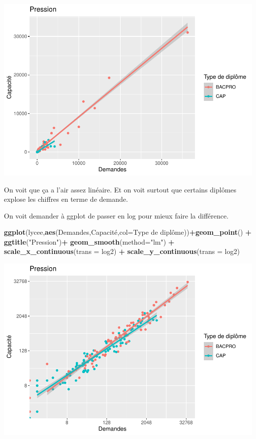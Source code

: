 \documentclass[
]{book}
\newenvironment{Shaded}{\begin{snugshade}}{\end{snugshade}}
\newcommand{\AttributeTok}[1]{\textcolor[rgb]{0.13,0.29,0.53}{#1}}
\newcommand{\FunctionTok}[1]{\textcolor[rgb]{0.13,0.29,0.53}{\textbf{#1}}}
\newcommand{\NormalTok}[1]{#1}
\newcommand{\SpecialCharTok}[1]{\textcolor[rgb]{0.81,0.36,0.00}{\textbf{#1}}}
\newcommand{\StringTok}[1]{\textcolor[rgb]{0.31,0.60,0.02}{#1}}
\begin{document}
\includegraphics{_main_files/figure-latex/lycee1-1.pdf}

On voit que ça a l'air assez linéaire. Et on voit surtout que certains diplômes
explose les chiffres en terme de demande.

On voit demander à ggplot de passer en log pour mieux faire la différence.

\begin{Shaded}
\begin{Highlighting}[]
\FunctionTok{ggplot}\NormalTok{(lycee,}\FunctionTok{aes}\NormalTok{(Demandes,Capacité,}\AttributeTok{col=}\StringTok{\textasciigrave{}}\AttributeTok{Type de diplôme}\StringTok{\textasciigrave{}}\NormalTok{))}\SpecialCharTok{+}\FunctionTok{geom\_point}\NormalTok{() }\SpecialCharTok{+}
  \FunctionTok{ggtitle}\NormalTok{(}\StringTok{"Pression"}\NormalTok{)}\SpecialCharTok{+}
  \FunctionTok{geom\_smooth}\NormalTok{(}\AttributeTok{method=}\StringTok{"lm"}\NormalTok{) }\SpecialCharTok{+}
  \FunctionTok{scale\_x\_continuous}\NormalTok{(}\AttributeTok{trans =} \StringTok{\textquotesingle{}log2\textquotesingle{}}\NormalTok{) }\SpecialCharTok{+}
  \FunctionTok{scale\_y\_continuous}\NormalTok{(}\AttributeTok{trans =} \StringTok{\textquotesingle{}log2\textquotesingle{}}\NormalTok{)}
\end{Highlighting}
\end{Shaded}

\includegraphics{_main_files/figure-latex/lycee2-1.pdf}
\end{document}
